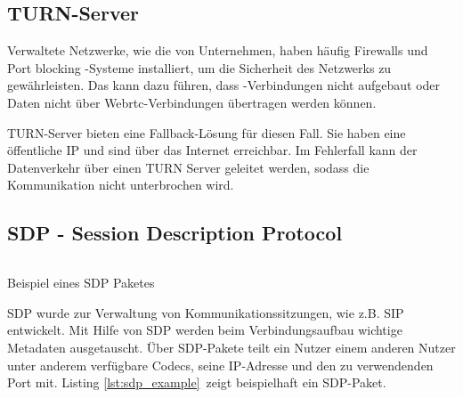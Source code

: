 %
%

\subsection{TURN-Server}

Verwaltete Netzwerke, wie die von Unternehmen, haben häufig Firewalls und Port blocking -Systeme installiert, um die Sicherheit des Netzwerks zu gewährleisten. Das kann dazu führen, dass \webrtc-Verbindungen nicht aufgebaut oder Daten nicht über Webrtc-Verbin\-dungen übertragen werden können.

TURN-Server bieten eine Fallback-Lösung für diesen Fall. Sie haben eine öffentliche IP und sind über das Internet erreichbar. Im Fehlerfall kann der Datenverkehr über einen TURN Server geleitet werden, sodass die Kommunikation nicht unterbrochen wird.

\subsection{SDP - Session Description Protocol}
\begin{listing}[h]
	\inputminted{javascript}{listings/sdp_example.txt}
	\caption{Beispiel eines SDP Paketes}
	\label{lst:sdp_example}
\end{listing}
SDP\cite{sdp-standard} wurde zur Verwaltung von Kommunikationssitzungen, wie z.B. SIP entwickelt. Mit Hilfe von SDP werden beim Verbindungsaufbau wichtige Metadaten ausgetauscht. Über SDP-Pakete teilt ein Nutzer einem anderen Nutzer unter anderem verfügbare Codecs, seine IP-Adresse und den zu verwendenden Port mit. Listing \ref{lst:sdp_example} zeigt beispielhaft ein SDP-Paket.




